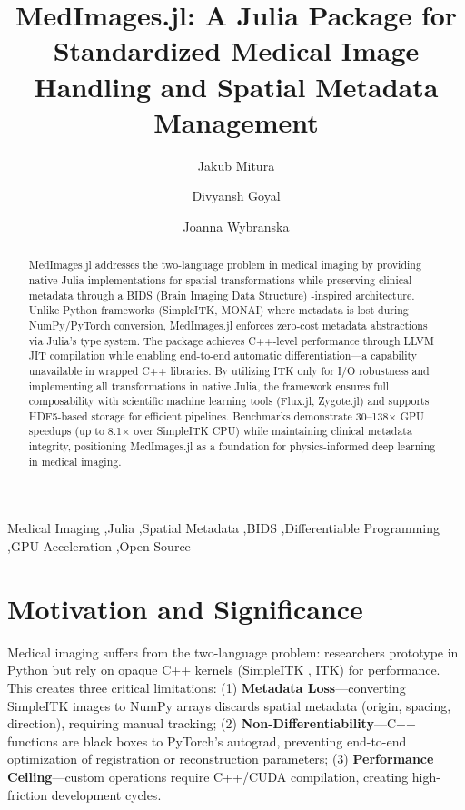 \documentclass[a4paper,10pt]{elsarticle}
\begin{document}
  \begin{frontmatter}

  \title{MedImages.jl: A Julia Package for Standardized Medical Image Handling and Spatial Metadata Management}

  \author[1]{Jakub Mitura}
  \author[1]{Divyansh Goyal}
  \author[1]{Joanna Wybranska}
  \ead{}


  \address[1]{JuliaHealth}

  \begin{abstract}
  MedImages.jl addresses the two-language problem in medical imaging by providing native Julia implementations for spatial transformations while preserving clinical metadata through a BIDS (Brain Imaging Data Structure) -inspired
  architecture. Unlike Python frameworks (SimpleITK, MONAI) where metadata is lost during NumPy/PyTorch conversion, MedImages.jl enforces zero-cost metadata abstractions via Julia's type system. The package achieves C++-level performance
  through LLVM JIT compilation while enabling end-to-end automatic differentiation—a capability unavailable in wrapped C++ libraries. By utilizing ITK only for I/O robustness and implementing all transformations in native Julia, the
  framework ensures full composability with scientific machine learning tools (Flux.jl, Zygote.jl) and supports HDF5-based storage for efficient pipelines. Benchmarks demonstrate 30--138× GPU speedups (up to 8.1× over SimpleITK CPU) while maintaining clinical metadata
   integrity, positioning MedImages.jl as a foundation for physics-informed deep learning in medical imaging.
  \end{abstract}

  \begin{keyword}
  Medical Imaging \sep Julia \sep Spatial Metadata \sep BIDS \sep Differentiable Programming \sep GPU Acceleration \sep Open Source
  \end{keyword}

  \end{frontmatter}

  \linenumbers

  \section{Motivation and Significance}

  Medical imaging suffers from the two-language problem: researchers prototype in Python but rely on opaque C++ kernels (SimpleITK \cite{LowekampChen2013, YanivLowekamp2017}, ITK) for performance. This creates three critical limitations: (1) \textbf{Metadata Loss}—converting
  SimpleITK images to NumPy arrays discards spatial metadata (origin, spacing, direction), requiring manual tracking; (2) \textbf{Non-Differentiability}—C++ functions are black boxes to PyTorch's \cite{Paszke_2019} autograd, preventing end-to-end
  optimization of registration or reconstruction parameters; (3) \textbf{Performance Ceiling}—custom operations require C++/CUDA compilation, creating high-friction development cycles.
\end{document}
